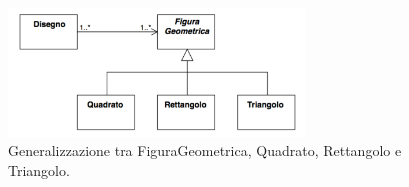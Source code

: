 \documentclass{article}
\begin{document}
\begin{figure}[h!]
  \centering
    \includegraphics[width=0.7\textwidth]{Img/Generalizzazione.pdf}
      \caption{Generalizzazione tra FiguraGeometrica, Quadrato, Rettangolo e Triangolo.}
      \label{Fig:Generalizzazione}
\end{figure}



%
%
%
%
\end{document}

